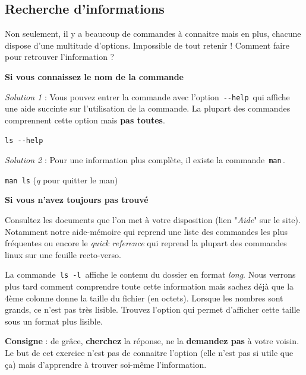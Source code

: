 \documentclass[a4paper,11pt]{article}
\begin{document}
\subsection{Recherche d'informations}  
Non seulement, il y a beaucoup de commandes \`a connaitre mais en plus, chacune dispose d'une multitude d'options. 
Impossible de tout retenir ! Comment faire pour retrouver l'information ?   

\par
\textbf{Si vous connaissez le nom de la commande}
\par
\textit{Solution 1} : Vous pouvez entrer la commande avec l'option \,\verb|--help|\,
qui affiche une aide succinte sur l'utilisation de la commande.
La  plupart des commandes comprennent cette option mais \textbf{pas toutes}.   

\par

\begin{Exemple}{}
	\verb_ls --help_
\end{Exemple}
\par
\textit{Solution 2} : Pour une information plus compl\`ete, il existe la commande \,\verb|man|\,.  

\par

\begin{Exemple}{}
	\verb_man ls_ (\textit{q} pour quitter le man)  
\end{Exemple}

\par
\textbf{Si vous n'avez toujours pas trouv\'e}
\par

Consultez les documents que l'on met \`a votre disposition 
(lien "\textit{Aide}" sur le site).
Notamment notre aide-m\'emoire qui reprend une liste des commandes les plus fr\'equentes 
ou encore le \textit{quick reference} 
qui reprend la plupart des commandes linux sur une feuille recto-verso.  

\par

\begin{Exercice}{} 
	La commande \,\verb|ls -l|\, 
	affiche le contenu du dossier en format \textit{long}.
	Nous verrons plus tard comment comprendre toute cette information 
	mais sachez d\'ej\`a que la 4\`eme colonne donne la taille du fichier (en octets).
	Lorsque les nombres sont grands, ce n'est pas tr\`es lisible. 
	Trouvez l'option qui permet d'afficher cette taille sous un format plus lisible.  
	
	\par
	\textbf{Consigne} : de gr\^ace, 
	\textbf{cherchez} la r\'eponse, 
	ne la \textbf{demandez pas} \`a votre voisin. 
	Le but de cet exercice n'est pas de connaitre l'option 
	(elle n'est pas si utile que \c ca) 
	mais d'apprendre \`a trouver soi-m\^eme l'information.  
	
	\par	
\end{Exercice}
\end{document}
